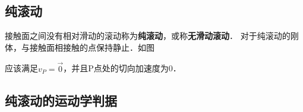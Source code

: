 
\begin{issues}
\issueDraft
\issueTODO
\end{issues}

\subsection{纯滚动}
接触面之间没有相对滑动的滚动称为\textbf{纯滚动}，或称\textbf{无滑动滚动}．
对于纯滚动的刚体，与接触面相接触的点保持静止．如图

应该满足$v_P=\vec 0$，并且P点处的切向加速度为0．

\subsection{纯滚动的运动学判据}
